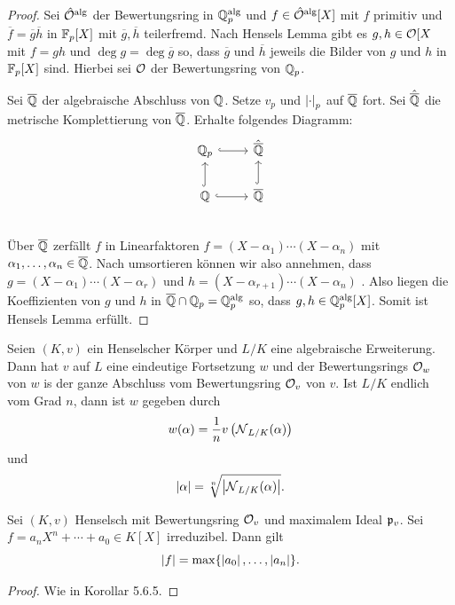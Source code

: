 \begin{proof}
	Sei $\hat{\mathcal{O}}^{\operatorname{alg}}$ der Bewertungsring in $\mathbb{Q}_p^{\operatorname{alg}}$ und $f\in\hat{\mathcal{O}}^{\operatorname{alg}}[X]$
	mit $f$ primitiv und $\overline{f} = \overline{g} \overline{h}$ in $\mathbb{F}_p[X]$ mit $\overline{g}, \overline{h}$ teilerfremd.
	Nach Hensels Lemma gibt es $g,h \in \mathcal{O}[X$ mit $f=gh$ und $\deg g = \deg \overline{g}$ so, dass $\overline{g}$ und $\overline{h}$ jeweils die Bilder von $g$ und $h$ in $\mathbb{F}_p[X]$ sind. Hierbei sei $\mathcal{O}$ der Bewertungsring von $\mathbb{Q}_p$.
	
	\bigskip Sei $\overline{\mathbb{Q}}$ der algebraische Abschluss von $\mathbb{Q}$. Setze $v_p$ und $\left|{\cdot}\right|_p$ auf $\overline{\mathbb{Q}}$ fort. Sei $\hat{\overline{\mathbb{Q}}}$ die metrische Komplettierung von $\overline{\mathbb{Q}}$. Erhalte folgendes Diagramm:
	\[ \begin{tikzcd}
	\Q_p
	\arrow[hookrightarrow]{r}
	& \hat{\overline{\Q}}
	\\
	\Q
	\arrow[hookrightarrow]{r}
	\arrow[hookrightarrow]{u}
	&\overline{\Q}
	\arrow[hookrightarrow]{u}
	\\
	\end{tikzcd}
	\]
Über $\overline{\mathbb{Q}}$ zerfällt $f$ in Linearfaktoren $f=(X-\alpha_1) \cdots (X-\alpha_n)$ mit $\alpha_1, \dots, \alpha_n \in\overline{\mathbb{Q}}$. Nach umsortieren können wir also annehmen, dass
$g=(X-\alpha_1) \cdots (X-\alpha_r)$ und $h=(X-\alpha_{r+1}) \cdots (X-\alpha_n)$ . Also liegen die Koeffizienten von $g$ und $h$ in $\overline{\mathbb{Q}} \cap \mathbb{Q}_p = \mathbb{Q}_p^{\operatorname{alg}}$ so, dass $g,h \in \mathbb{Q}_p^{\operatorname{alg}}[X]$. Somit ist Hensels Lemma erfüllt.
\end{proof}

\begin{Prop}
	Seien $(K,v)$ ein Henselscher Körper und $L/K$ eine algebraische Erweiterung. Dann hat $v$ auf $L$ eine eindeutige Fortsetzung $w$ und der Bewertungsrings $\mathcal{O}_w$ von $w$ is der ganze Abschluss vom Bewertungsring $\mathcal{O}_v$ von $v$. Ist $L/K$ endlich vom Grad $n$, dann ist $w$ gegeben durch
	\[ w(\alpha) = \frac{1}{n} v \left( \operatorname{\mathcal{N}}_{L/K} ( \alpha) \right)
	\]
	und
	\[ \left|{\alpha}\right| = \sqrt[n]{\left|{\operatorname{\mathcal{N}}_{L/K}(\alpha)}\right|}.
	\]
\end{Prop}


\begin{Bem}
	Sei $(K,v)$ Henselsch mit Bewertungsring $\mathcal{O}_v$ und maximalem Ideal $\mathfrak{p}_v$.
	Sei $f= a_nX^n + \cdots + a_0 \in K[X]$ irreduzibel. Dann gilt
	\[ \left|{f}\right| =\max \{  \left|{a_0}\right|, \dots, \left|{a_n}\right| \}.
	\]
\end{Bem}

\begin{proof}
	Wie in Korollar 5.6.5.
\end{proof}

